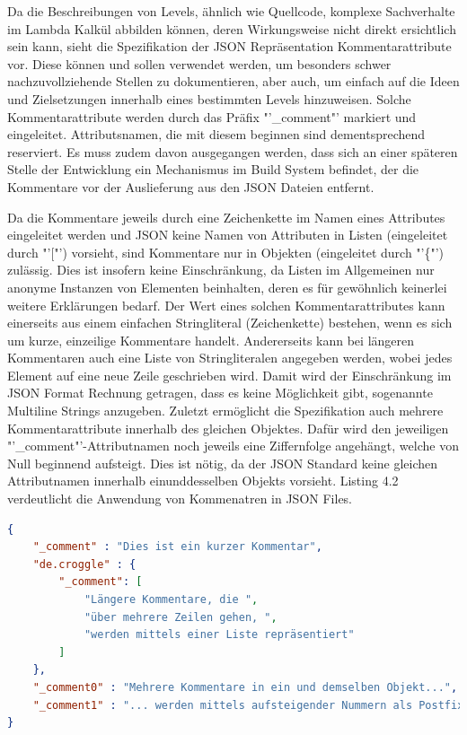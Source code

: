 Da die Beschreibungen von Levels, ähnlich wie Quellcode, komplexe Sachverhalte im Lambda Kalkül abbilden können, deren Wirkungsweise nicht direkt ersichtlich sein kann,
sieht die Spezifikation der JSON Repräsentation Kommentarattribute vor.
Diese können und sollen verwendet werden, um besonders schwer nachzuvollziehende Stellen zu dokumentieren, aber auch, um einfach auf die Ideen und Zielsetzungen innerhalb eines bestimmten Levels hinzuweisen.
Solche Kommentarattribute werden durch das Präfix "'\_comment"' markiert und eingeleitet.
Attributsnamen, die mit diesem beginnen sind dementsprechend reserviert.
Es muss zudem davon ausgegangen werden, dass sich an einer späteren Stelle der Entwicklung ein Mechanismus im Build System befindet, der die Kommentare vor der Auslieferung aus den JSON Dateien entfernt.

Da die Kommentare jeweils durch eine Zeichenkette im Namen eines Attributes eingeleitet werden und JSON keine Namen von Attributen in Listen (eingeleitet durch "'["') vorsieht, sind Kommentare nur in Objekten (eingeleitet durch "'\{"') zulässig.
Dies ist insofern keine Einschränkung, da Listen im Allgemeinen nur anonyme Instanzen von Elementen beinhalten, deren es für gewöhnlich keinerlei weitere Erklärungen bedarf.
Der Wert eines solchen Kommentarattributes kann einerseits aus einem einfachen Stringliteral (Zeichenkette) bestehen, wenn es sich um kurze, einzeilige Kommentare handelt.
Andererseits kann bei längeren Kommentaren auch eine Liste von Stringliteralen angegeben werden, wobei jedes Element auf eine neue Zeile geschrieben wird.
Damit wird der Einschränkung im JSON Format Rechnung getragen, dass es keine Möglichkeit gibt, sogenannte Multiline Strings anzugeben.
Zuletzt ermöglicht die Spezifikation auch mehrere Kommentarattribute innerhalb des gleichen Objektes.
Dafür wird den jeweiligen "'\_comment"'-Attributnamen noch jeweils eine Ziffernfolge angehängt, welche von Null beginnend aufsteigt.
Dies ist nötig, da der JSON Standard keine gleichen Attributnamen innerhalb einunddesselben Objekts vorsieht.
Listing 4.2 verdeutlicht die Anwendung von Kommenatren in JSON Files.
\begin{lstlisting}[language=json,caption={Kommentare in einer JSON Datei}]
{
	"_comment" : "Dies ist ein kurzer Kommentar",
	"de.croggle" : {
		"_comment": [
			"Längere Kommentare, die ",
			"über mehrere Zeilen gehen, ",
			"werden mittels einer Liste repräsentiert"
		]
	},
	"_comment0" : "Mehrere Kommentare in ein und demselben Objekt...",
	"_comment1" : "... werden mittels aufsteigender Nummern als Postfix unterschieden"
}
\end{lstlisting}

